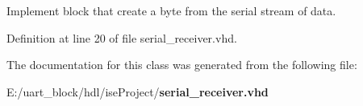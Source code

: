 Implement block that create a byte from the serial stream of data. 

Definition at line 20 of file serial\-\_\-receiver.\-vhd.



The documentation for this class was generated from the following file\-:\begin{DoxyCompactItemize}
\item 
E\-:/uart\-\_\-block/hdl/ise\-Project/{\bf serial\-\_\-receiver.\-vhd}\end{DoxyCompactItemize}
